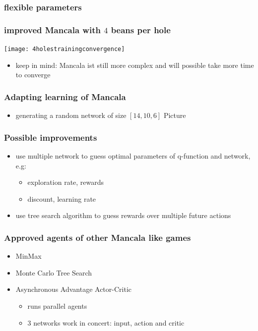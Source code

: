 \documentclass{beamer}
\begin{document}
\begin{frame}
\frametitle{flexible parameters}

\end{frame}

 \begin{frame}
\frametitle{improved Mancala with $4$ beans per hole}
 \texttt{[image: 4holestrainingconvergence]}
\begin{itemize}
\item keep in mind: Mancala ist still more complex and will possible take more time to converge
\end{itemize}
 \end{frame}

\begin{frame} 
\frametitle{Adapting learning of Mancala}
\begin{itemize}
\item generating a random network of size $[14,10,6]$
Picture
\end{itemize}
\end{frame}
\begin{frame}
\frametitle{Possible improvements}
\begin{itemize}
\item use multiple network to guess optimal parameters of q-function and network, e.g:
\begin{itemize}
\item exploration rate, rewards
\item discount, learning rate
\end{itemize}
\item use tree search algorithm to guess rewards over multiple future actions
\end{itemize}
\end{frame}
\begin{frame}
\frametitle{Approved agents of other Mancala like games}
\begin{itemize}
\item MinMax
\item Monte Carlo Tree Search
\item Asynchronous Advantage Actor-Critic
\begin{itemize}
\item runs parallel agents
\item 3 networks work in concert: input, action and critic
\end{itemize}
\end{itemize}
\end{frame}
\end{document}
